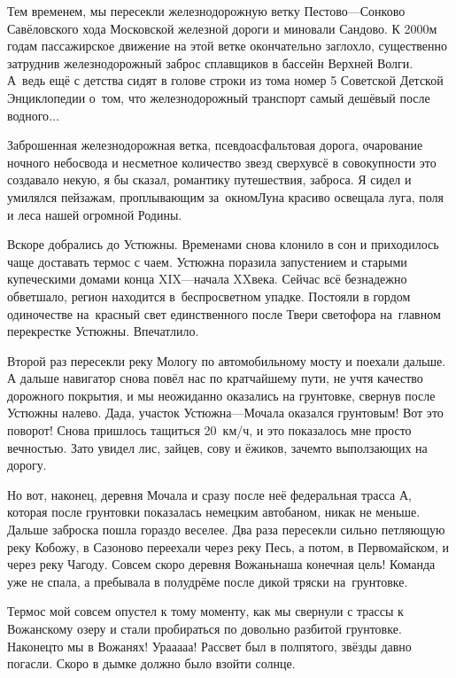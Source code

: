 Тем временем, мы пересекли железнодорожную ветку Пестово\thinspace\nobreakdash---\thinspace Сонково Савёловского хода Московской железной дороги и миновали Сандово. К 2000\sdash м годам пассажирское движение на этой ветке окончательно заглохло, существенно затруднив железнодорожный заброс сплавщиков в бассейн Верхней Волги. А~ведь ещё с детства сидят в голове строки из тома номер 5 Советской Детской Энциклопедии о~том, что железнодорожный транспорт самый дешёвый после водного$\ldots$ 

Заброшенная железнодорожная ветка, псевдоасфальтовая дорога, очарование ночного небосвода и несметное количество звезд сверху\mdash всё в совокупности это создавало некую, я бы сказал, романтику путешествия, заброса. Я сидел и умилялся пейзажам, проплывающим за~окном\mdash Луна красиво освещала луга, поля и леса нашей огромной Родины. 

Вскоре добрались до Устюжны. Временами снова клонило в сон и приходилось чаще доставать термос с чаем. Устюжна поразила запустением и старыми купеческими домами конца XIX\thinspace\nobreakdash---\thinspace начала XX\thinspace века. Сейчас всё безнадежно обветшало, регион находится в~беспросветном упадке. Постояли в гордом одиночестве на~красный свет единственного после Твери светофора на~главном перекрестке Устюжны. Впечатлило. 

Второй раз пересекли реку Мологу по автомобильному мосту и поехали дальше. А дальше навигатор снова повёл нас по кратчайшему пути, не учтя качество дорожного покрытия, и мы неожиданно оказались на грунтовке, свернув после Устюжны налево. Да\sdash да,  участок Устюжна\thinspace\nobreakdash---\thinspace Мочала оказался грунтовым! Вот это поворот! Снова пришлось тащиться 20\thinspace\nbdash{}~км/ч, и это показалось мне просто вечностью. Зато увидел лис, зайцев, сову и ёжиков, зачем\sdash то выползающих на дорогу. 

Но вот, наконец, деревня Мочала и сразу после неё федеральная трасса А, которая после грунтовки показалась немецким автобаном, никак не меньше. Дальше заброска пошла гораздо веселее. Два раза пересекли сильно петляющую реку Кобожу, в Сазоново переехали через реку Песь, а потом, в Первомайском, и через реку Чагоду. Совсем скоро деревня Вожань\mdash наша конечная цель! Команда уже не спала, а пребывала в полудрёме после дикой тряски на~грунтовке.

Термос мой совсем опустел к тому моменту, как мы свернули с трассы к Вожанскому озеру и стали пробираться по довольно разбитой грунтовке. Наконец\sdash то мы в Вожанях! Ура\sdash а\sdash а\sdash а\sdash а! Рассвет был в полпятого, звёзды давно погасли. Скоро в дымке должно было взойти солнце. 

